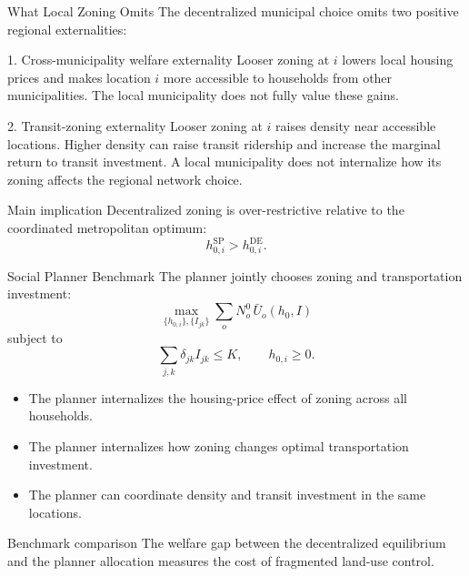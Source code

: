 \documentclass[10pt]{beamer}
\begin{document}
\begin{frame}[shrink=3]{What Local Zoning Omits}
The decentralized municipal choice omits two positive regional externalities:

\vspace{0.12cm}
\begin{block}{1. Cross-municipality welfare externality}
Looser zoning at $i$ lowers local housing prices and makes location $i$ more accessible to households from other municipalities. The local municipality does not fully value these gains.
\end{block}

\vspace{0.12cm}
\begin{block}{2. Transit-zoning externality}
Looser zoning at $i$ raises density near accessible locations. Higher density can raise transit ridership and increase the marginal return to transit investment. A local municipality does not internalize how its zoning affects the regional network choice.
\end{block}

\vspace{0.12cm}
\begin{alertblock}{Main implication}
Decentralized zoning is over-restrictive relative to the coordinated metropolitan optimum:
\[
h_{0,i}^{\mathrm{SP}} > h_{0,i}^{\mathrm{DE}}.
\]
\end{alertblock}
\end{frame}

\begin{frame}{Social Planner Benchmark}
The planner jointly chooses zoning and transportation investment:
\[
\max_{\{h_{0,i}\},\{I_{jk}\}}
\sum_o N_o^0\,\bar U_o(h_0,I)
\]
subject to
\[
\sum_{j,k}\delta_{jk}I_{jk}\leq K,
\qquad
h_{0,i}\geq 0.
\]

\vspace{0.25cm}
\begin{itemize}
    \item The planner internalizes the housing-price effect of zoning across all households.
    \item The planner internalizes how zoning changes optimal transportation investment.
    \item The planner can coordinate density and transit investment in the same locations.
\end{itemize}

\vspace{0.25cm}
\begin{block}{Benchmark comparison}
The welfare gap between the decentralized equilibrium and the planner allocation measures the cost of fragmented land-use control.
\end{block}
\end{frame}
\end{document}
